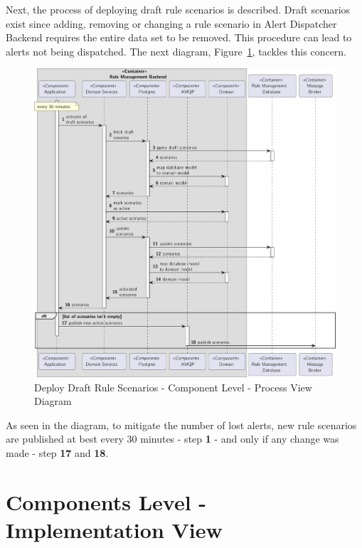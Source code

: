 Next, the process of deploying draft rule scenarios is described.
Draft scenarios exist since adding, removing or changing a rule scenario in Alert Dispatcher Backend requires the entire data set to be removed. This procedure can lead to alerts not being dispatched. The next diagram, Figure~\ref{fig:design:architecture:platform:component:process:diagram:rule}, tackles this concern.

\begin{figure}[H]
   \centering
   \includegraphics[page=1,width=\columnwidth]{assets/diagrams/design/architectural/level3/process/rule-management-backend.pdf}
   \caption[Deploy Draft Rule Scenarios - Component Level - Process View Diagram]{Deploy Draft Rule Scenarios - Component Level - Process View Diagram}
   \label{fig:design:architecture:platform:component:process:diagram:rule}
\end{figure}

As seen in the diagram, to mitigate the number of lost alerts, new rule scenarios are published at best every 30 minutes - step \textbf{1} - and only if any change was made - step \textbf{17} and \textbf{18}.

\section{Components Level - Implementation View}
\label{par:design:architecture:platform:components:development}

